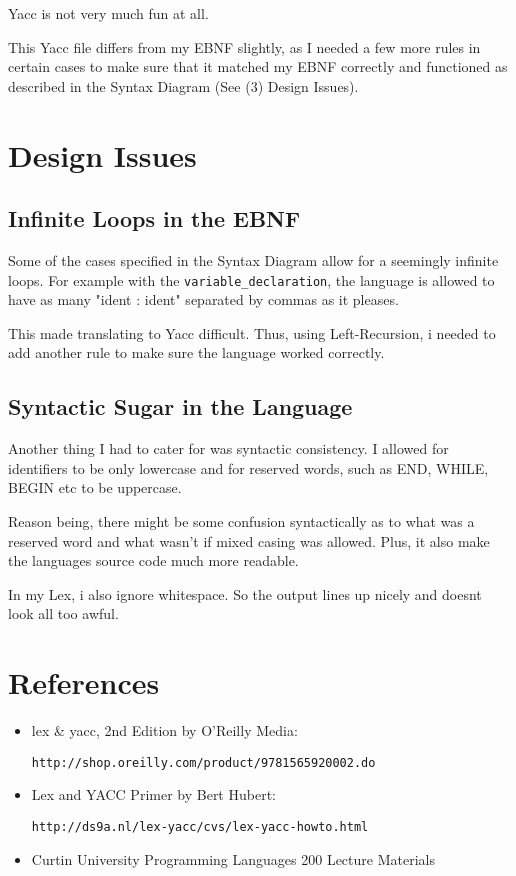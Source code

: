 \documentclass[a4paper,12pt,notitlepage]{article}
\begin{document}
Yacc is not very much fun at all.

This Yacc file differs from my EBNF slightly, as I needed a few more rules in certain cases to make sure that it matched my EBNF correctly and functioned as described in the Syntax Diagram (See (3) Design Issues).


\section{Design Issues}



\subsection{Infinite Loops in the EBNF}
Some of the cases specified in the Syntax Diagram allow for a seemingly infinite loops.
For example with the \texttt{variable\_declaration}, the language is allowed to have as many "ident : ident" separated by commas as it pleases.

This made translating to Yacc difficult. Thus, using Left-Recursion, i needed to add another rule to make sure the language worked correctly.

\subsection{Syntactic Sugar in the Language}
Another thing I had to cater for was syntactic consistency.
I allowed for identifiers to be only lowercase and for reserved words, such as END, WHILE, BEGIN etc to be uppercase. 

Reason being, there might be some confusion syntactically as to what was a reserved word and what wasn't if mixed casing was allowed. Plus, it also make the languages source code much more readable.

In my Lex, i also ignore whitespace. So the output lines up nicely and doesnt look all too awful.

\section{References}
\begin{itemize}
    \item lex \& yacc, 2nd Edition by O'Reilly Media: 
    
    \texttt{http://shop.oreilly.com/product/9781565920002.do}
    
    \item Lex and YACC Primer by Bert Hubert:
    
    \texttt{http://ds9a.nl/lex-yacc/cvs/lex-yacc-howto.html}
    \item Curtin University Programming Languages 200 Lecture Materials 
    
\end{itemize}
\end{document}
